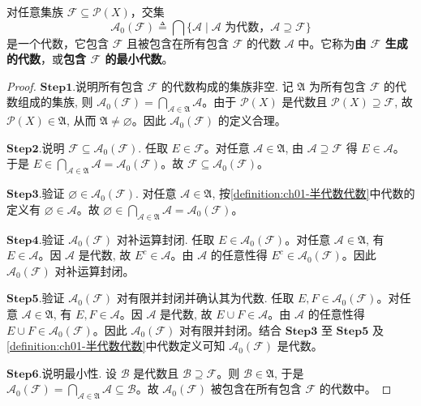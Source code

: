 \documentclass[../../main.tex]{subfiles}%
\begin{document}
\begin{proposition}
对任意集族 $\mathcal{F}\subseteq\mathcal{P}(X)$，交集
\[
\mathcal{A}_0(\mathcal{F})\triangleq \bigcap\{\mathcal{A}\mid\mathcal{A}\text{ 为代数，}\mathcal{A}\supseteq\mathcal{F}\}
\]
是一个代数，它包含 $\mathcal{F}$ 且被包含在所有包含 $\mathcal{F}$ 的代数 $\mathcal{A}$ 中。它称为\textbf{由 $\mathcal{F}$ 生成的代数}，或\textbf{包含 $\mathcal{F}$ 的最小代数}。
\end{proposition}
\begin{proof}
\noindent$\mathbf{Step}\mathbf{1}.${\heiti 说明所有包含 $\mathcal{F}$ 的代数构成的集族非空.}
记 $\mathfrak{A}$ 为所有包含 $\mathcal{F}$ 的代数组成的集族, 则 $\mathcal{A}_0(\mathcal{F})=\bigcap\limits_{\mathcal{A}\in\mathfrak{A}}\mathcal{A}$。由于 $\mathcal{P}(X)$ 是代数且 $\mathcal{P}(X)\supseteq\mathcal{F}$, 故 $\mathcal{P}(X)\in\mathfrak{A}$, 从而 $\mathfrak{A}\neq\varnothing$。因此 $\mathcal{A}_0(\mathcal{F})$ 的定义合理。

\noindent$\mathbf{Step}\mathbf{2}.${\heiti 说明 $\mathcal{F}\subseteq\mathcal{A}_0(\mathcal{F})$.}
任取 $E\in\mathcal{F}$。对任意 $\mathcal{A}\in\mathfrak{A}$, 由 $\mathcal{A}\supseteq\mathcal{F}$ 得 $E\in\mathcal{A}$。于是 $E\in\bigcap\limits_{\mathcal{A}\in\mathfrak{A}}\mathcal{A}=\mathcal{A}_0(\mathcal{F})$。故 $\mathcal{F}\subseteq\mathcal{A}_0(\mathcal{F})$。

\noindent$\mathbf{Step}\mathbf{3}.${\heiti 验证 $\varnothing\in\mathcal{A}_0(\mathcal{F})$.}
对任意 $\mathcal{A}\in\mathfrak{A}$, 按\cref{definition:ch01-半代数代数}中代数的定义有 $\varnothing\in\mathcal{A}$。故 $\varnothing\in\bigcap\limits_{\mathcal{A}\in\mathfrak{A}}\mathcal{A}=\mathcal{A}_0(\mathcal{F})$。

\noindent$\mathbf{Step}\mathbf{4}.${\heiti 验证 $\mathcal{A}_0(\mathcal{F})$ 对补运算封闭.}
任取 $E\in\mathcal{A}_0(\mathcal{F})$。对任意 $\mathcal{A}\in\mathfrak{A}$, 有 $E\in\mathcal{A}$。因 $\mathcal{A}$ 是代数, 故 $E^c\in\mathcal{A}$。由 $\mathcal{A}$ 的任意性得 $E^c\in\mathcal{A}_0(\mathcal{F})$。因此 $\mathcal{A}_0(\mathcal{F})$ 对补运算封闭。

\noindent$\mathbf{Step}\mathbf{5}.${\heiti 验证 $\mathcal{A}_0(\mathcal{F})$ 对有限并封闭并确认其为代数.}
任取 $E,F\in\mathcal{A}_0(\mathcal{F})$。对任意 $\mathcal{A}\in\mathfrak{A}$, 有 $E,F\in\mathcal{A}$。因 $\mathcal{A}$ 是代数, 故 $E\cup F\in\mathcal{A}$。由 $\mathcal{A}$ 的任意性得 $E\cup F\in\mathcal{A}_0(\mathcal{F})$。因此 $\mathcal{A}_0(\mathcal{F})$ 对有限并封闭。结合 $\mathbf{Step3}$ 至 $\mathbf{Step5}$ 及\cref{definition:ch01-半代数代数}中代数定义可知 $\mathcal{A}_0(\mathcal{F})$ 是代数。

\noindent$\mathbf{Step}\mathbf{6}.${\heiti 说明最小性.}
设 $\mathcal{B}$ 是代数且 $\mathcal{B}\supseteq\mathcal{F}$。则 $\mathcal{B}\in\mathfrak{A}$, 于是 $\mathcal{A}_0(\mathcal{F})=\bigcap\limits_{\mathcal{A}\in\mathfrak{A}}\mathcal{A}\subseteq\mathcal{B}$。故 $\mathcal{A}_0(\mathcal{F})$ 被包含在所有包含 $\mathcal{F}$ 的代数中。
\end{proof}
\end{document}
